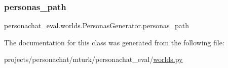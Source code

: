 \subsubsection{\texorpdfstring{personas\+\_\+path}{personas\_path}}
{\footnotesize\ttfamily personachat\+\_\+eval.\+worlds.\+Personas\+Generator.\+personas\+\_\+path}



The documentation for this class was generated from the following file\+:\begin{DoxyCompactItemize}
\item 
projects/personachat/mturk/personachat\+\_\+eval/\hyperlink{projects_2personachat_2mturk_2personachat__eval_2worlds_8py}{worlds.\+py}\end{DoxyCompactItemize}
